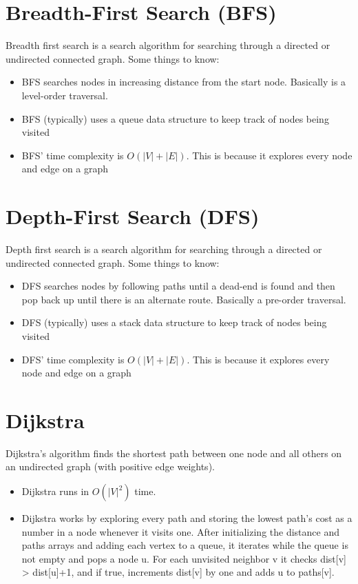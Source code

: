\documentclass{article}
\begin{document}
\section{Breadth-First Search (BFS)}
Breadth first search is a search algorithm for searching through a directed or undirected connected graph. Some things to know:

\begin{itemize}
    \item BFS searches nodes in increasing distance from the start node. Basically is a level-order traversal.
    \item BFS (typically) uses a queue data structure to keep track of nodes being visited
    \item BFS' time complexity is $O(|V|+|E|)$. This is because it explores every node and edge on a graph
\end{itemize}

\section{Depth-First Search (DFS)}
Depth first search is a search algorithm for searching through a directed or undirected connected graph. Some things to know:

\begin{itemize}
    \item DFS searches nodes by following paths until a dead-end is found and then pop back up until there is an alternate route. Basically a pre-order traversal. 
    \item DFS (typically) uses a stack data structure to keep track of nodes being visited
    \item DFS' time complexity is $O(|V|+|E|)$. This is because it explores every node and edge on a graph
\end{itemize}

\section{Dijkstra}
Dijkstra's algorithm finds the shortest path between one node and all others on an undirected graph (with positive edge weights). 
\begin{itemize}
    \item Dijkstra runs in $O(|V|^2)$ time.
    \item Dijkstra works by exploring every path and storing the lowest path's cost as a number in a
      node whenever it visits one. After initializing the distance and paths arrays and
      adding each vertex to a queue, it iterates while the queue is not empty and pops a node u. For
      each unvisited neighbor v it checks dist[v] > dist[u]+1, and if true, increments dist[v] by
      one and adds u to paths[v].
\end{itemize}
\end{document}
